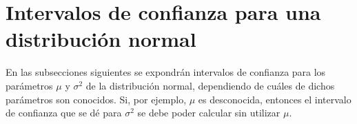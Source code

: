 \documentclass[11pt]{report}
\newtheorem{definition}{Definición}
\theoremstyle{definition}
\newtheorem{example}{Ejemplo}
\newcommand{\pars}[1]{\left( #1 \right)}
\newcommand{\comment}[1]{}
\begin{document}
\comment{
\section{Método del pivote}

\begin{definition}
Sea $X$ una variable aleatoria cuya distribución depende de un parámetro $\theta$, y sea $(X_1,\mathellipsis,X_n)$ una muestra aleatoria simple de $X$. Una variable aleatoria $Q_\theta(X_1,\mathellipsis,X_n)$ se dice que es un \emph{pivote para $\theta$} si su distribución no depende de $\theta$, cualquiera que sea $\theta \in \Theta$.
\end{definition}

En lugar de dar un procedimiento general, se expondrá un ejemplo sobre cómo utilizar pivotes para hallar el intervalo de confianza adecuado.

\begin{example}
Sea $X \sim Exp(\theta)$ y sea $(X_1,\mathellipsis,X_n)$ una muestra aleatoria simple de $X$. Veamos que
\[Q_\theta(X_1,\mathellipsis,X_n,)= \theta\sum_{i=1}^n X_i\]
es un pivote para $\theta$. Fijemos $\theta \in \Theta$. En primer lugar, como $X_i \sim Exp(\theta)$, entonces
\[\sum_{i=1}^n X_i\sim Ga(n,\theta),\]
luego, si se recuerda la \hyperref[prop2.10]{\color{blue}Proposición 14},
\[Q = \theta\sum_{i=1}^n X_i \sim Ga(n,1),\]
así que $Q$ es un pivote para $\theta$. Sean
\[L(X_1,\mathellipsis,X_n) = \frac{Q_{\alpha/2}}{\sum_{i=1}^n X_i}, \qquad \qquad U(X_1,\mathellipsis,X_n) = \frac{Q_{1-\alpha/2}}{\sum_{i=1}^n X_i},\]
Entonces
\[P\pars{\frac{Q_{\alpha/2}}{\sum_{i=1}^n X_i} \leq \theta \leq \frac{Q_{1-\alpha/2}}{\sum_{i=1}^n X_i}} = P\pars{Q_{\alpha/2} \leq Q \leq Q_{1-\alpha/2}} = P\pars{Q \leq Q_{1-\alpha/2})-P(Q \leq Q_{\alpha/2}} = 1-\alpha,\]
y hemos encontrado un intervalo de confianza para $\theta$ de nivel de confianza $1-\alpha$.
\end{example}
}

\section{Intervalos de confianza para una distribución normal}

En las subsecciones siguientes se expondrán intervalos de confianza para los parámetros $\mu$ y $\sigma^2$ de la distribución normal, dependiendo de cuáles de dichos parámetros son conocidos. Si, por ejemplo, $\mu$ es desconocida, entonces el intervalo de confianza que se dé para $\sigma^2$ se debe poder calcular sin utilizar $\mu$.
\end{document}
